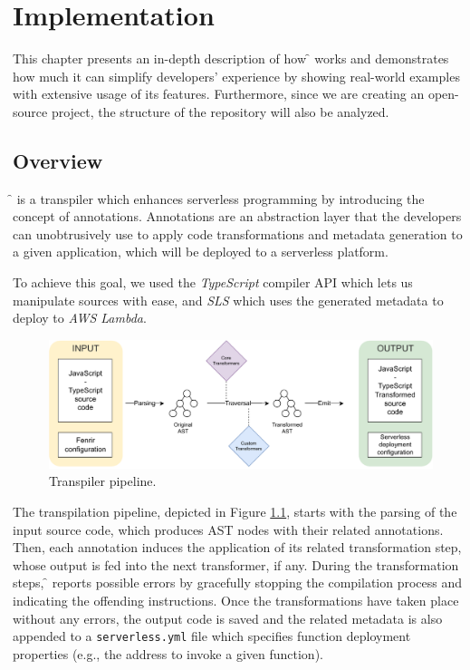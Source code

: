 \chapter{Implementation}
\label{chap:implementation}

This chapter presents an in-depth description of how \f{} works
and demonstrates how much it can simplify developers' experience
by showing real-world examples with extensive usage of its features.
Furthermore, since we are creating an open-source project, the structure of
the repository will also be analyzed.


\section{Overview}

\f{} is a transpiler which enhances serverless programming by introducing the concept of annotations.
Annotations are an abstraction layer that the developers can unobtrusively use
to apply code transformations and metadata generation to a given application,
which will be deployed to a serverless platform.

To achieve this goal, we used the \textit{TypeScript}\cite{ts} compiler API which lets us
manipulate sources with ease, and \textit{SLS}\cite{sls} which
uses the generated metadata to deploy to \textit{AWS Lambda}.

\begin{figure}[H]
  \centering
  \includegraphics[width=\textwidth]{diagrams/pipeline}
  \caption{Transpiler pipeline.}
  \label{fig:pipeline}
\end{figure}

The transpilation pipeline, depicted in Figure \ref{fig:pipeline},
starts with the parsing of the input source code, which produces AST nodes with their related
annotations. Then, each annotation induces the application of its related
transformation step, whose output is fed into the next transformer, if any.
During the transformation steps, \f{} reports possible errors by gracefully
stopping the compilation process and indicating the offending instructions. Once
the transformations have taken place without any errors, the output code is saved
and the related metadata is also appended to a
\verb|serverless.yml| file which specifies function deployment
properties (e.g., the address to invoke a given function).

